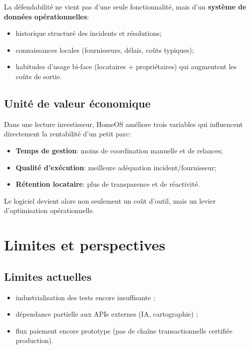\documentclass[11pt,a4paper]{article}
\begin{document}
La défendabilité ne vient pas d'une seule fonctionnalité, mais d'un \textbf{système de données opérationnelles}:

\begin{itemize}[leftmargin=1.4em]
  \item historique structuré des incidents et résolutions;
  \item connaissances locales (fournisseurs, délais, coûts typiques);
  \item habitudes d'usage bi-face (locataires + propriétaires) qui augmentent les coûts de sortie.
\end{itemize}

\subsection{Unité de valeur économique}

Dans une lecture investisseur, HomeOS améliore trois variables qui influencent directement la rentabilité d'un petit parc:

\begin{itemize}[leftmargin=1.4em]
  \item \textbf{Temps de gestion}: moins de coordination manuelle et de relances;
  \item \textbf{Qualité d'exécution}: meilleure adéquation incident/fournisseur;
  \item \textbf{Rétention locataire}: plus de transparence et de réactivité.
\end{itemize}

Le logiciel devient alors non seulement un coût d'outil, mais un levier d'optimisation opérationnelle.

\section{Limites et perspectives}

\subsection{Limites actuelles}

\begin{itemize}[leftmargin=1.4em]
  \item industrialisation des tests encore insuffisante ;
  \item dépendance partielle aux APIs externes (IA, cartographie) ;
  \item flux paiement encore prototype (pas de chaîne transactionnelle certifiée production).
\end{itemize}
\end{document}
